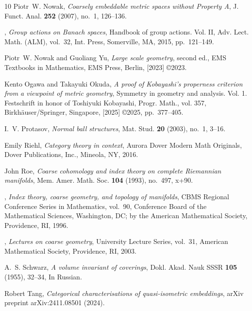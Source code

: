 \documentclass[12pt, a4paper]{amsart}
\theoremstyle{definition}
\begin{document}
\begin{thebibliography}{10}
Piotr~W. Nowak, \emph{Coarsely embeddable metric spaces without {P}roperty
  {A}}, J. Funct. Anal. \textbf{252} (2007), no.~1, 126--136. 

\bysame, \emph{Group actions on {B}anach spaces}, Handbook of group actions.
  {V}ol. {II}, Adv. Lect. Math. (ALM), vol.~32, Int. Press, Somerville, MA,
  2015, pp.~121--149. 

Piotr~W. Nowak and Guoliang Yu, \emph{Large scale geometry}, second ed., EMS
  Textbooks in Mathematics, EMS Press, Berlin, [2023] \copyright 2023.

Kento Ogawa and Takayuki Okuda, \emph{A proof of {K}obayashi's properness
  criterion from a viewpoint of metric geometry}, Symmetry in geometry and
  analysis. {V}ol. 1. {F}estschrift in honor of {T}oshiyuki {K}obayashi, Progr.
  Math., vol. 357, Birkh\"auser/Springer, Singapore, [2025] \copyright 2025,
  pp.~377--405. 

I.~V. Protasov, \emph{Normal ball structures}, Mat. Stud. \textbf{20} (2003),
  no.~1, 3--16. 

Emily Riehl, \emph{Category theory in context}, Aurora Dover Modern Math
  Originals, Dover Publications, Inc., Mineola, NY, 2016. 

John Roe, \emph{Coarse cohomology and index theory on complete {R}iemannian
  manifolds}, Mem. Amer. Math. Soc. \textbf{104} (1993), no.~497, x+90.

\bysame, \emph{Index theory, coarse geometry, and topology of manifolds}, CBMS
  Regional Conference Series in Mathematics, vol.~90, Conference Board of the
  Mathematical Sciences, Washington, DC; by the American Mathematical Society,
  Providence, RI, 1996. 

\bysame, \emph{Lectures on coarse geometry}, University Lecture Series,
  vol.~31, American Mathematical Society, Providence, RI, 2003. 

A.~S. Schwarz, \emph{A volume invariant of coverings}, Dokl. Akad. Nauk SSSR
  \textbf{105} (1955), 32--34, In Russian.

Robert Tang, \emph{Categorical characterisations of quasi-isometric
  embeddings}, arXiv preprint arXiv:2411.08501 (2024).


\end{thebibliography}
\end{document}
